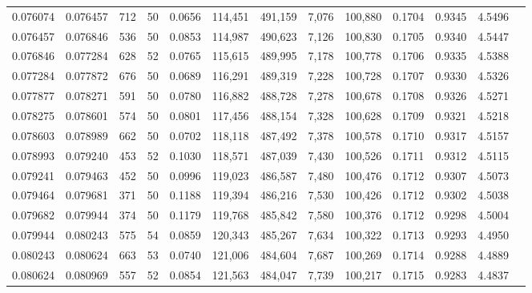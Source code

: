 \begin{tabular}{rrrrrrrrrrrrr}
0.076074 & 0.076457 &   712 &  50 &                                     0.0656 & 114,451 & 491,159 &   7,076 & 100,880 & 0.1704 & 0.9345 & 4.5496 \\
0.076457 & 0.076846 &   536 &  50 &                                     0.0853 & 114,987 & 490,623 &   7,126 & 100,830 & 0.1705 & 0.9340 & 4.5447 \\
0.076846 & 0.077284 &   628 &  52 &                                     0.0765 & 115,615 & 489,995 &   7,178 & 100,778 & 0.1706 & 0.9335 & 4.5388 \\
0.077284 & 0.077872 &   676 &  50 &                                     0.0689 & 116,291 & 489,319 &   7,228 & 100,728 & 0.1707 & 0.9330 & 4.5326 \\
0.077877 & 0.078271 &   591 &  50 &                                     0.0780 & 116,882 & 488,728 &   7,278 & 100,678 & 0.1708 & 0.9326 & 4.5271 \\
0.078275 & 0.078601 &   574 &  50 &                                     0.0801 & 117,456 & 488,154 &   7,328 & 100,628 & 0.1709 & 0.9321 & 4.5218 \\
0.078603 & 0.078989 &   662 &  50 &                                     0.0702 & 118,118 & 487,492 &   7,378 & 100,578 & 0.1710 & 0.9317 & 4.5157 \\
0.078993 & 0.079240 &   453 &  52 &                                     0.1030 & 118,571 & 487,039 &   7,430 & 100,526 & 0.1711 & 0.9312 & 4.5115 \\
0.079241 & 0.079463 &   452 &  50 &                                     0.0996 & 119,023 & 486,587 &   7,480 & 100,476 & 0.1712 & 0.9307 & 4.5073 \\
0.079464 & 0.079681 &   371 &  50 &                                     0.1188 & 119,394 & 486,216 &   7,530 & 100,426 & 0.1712 & 0.9302 & 4.5038 \\
0.079682 & 0.079944 &   374 &  50 &                                     0.1179 & 119,768 & 485,842 &   7,580 & 100,376 & 0.1712 & 0.9298 & 4.5004 \\
0.079944 & 0.080243 &   575 &  54 &                                     0.0859 & 120,343 & 485,267 &   7,634 & 100,322 & 0.1713 & 0.9293 & 4.4950 \\
0.080243 & 0.080624 &   663 &  53 &                                     0.0740 & 121,006 & 484,604 &   7,687 & 100,269 & 0.1714 & 0.9288 & 4.4889 \\
0.080624 & 0.080969 &   557 &  52 &                                     0.0854 & 121,563 & 484,047 &   7,739 & 100,217 & 0.1715 & 0.9283 & 4.4837 \\

\end{tabular}
